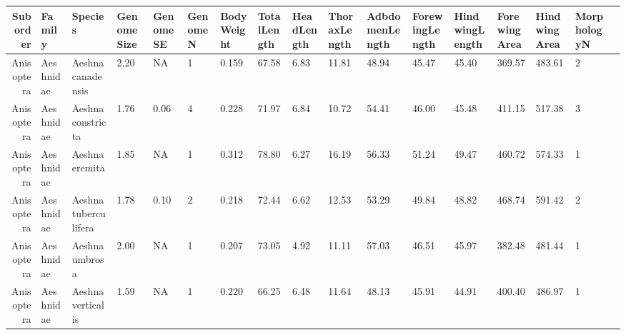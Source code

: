 \documentclass[11pt]{article}
\begin{document}
    \begin{tabular}{r|llllllllllllllll}
 Suborder & Family & Species & GenomeSize & GenomeSE & GenomeN & BodyWeight & TotalLength & HeadLength & ThoraxLength & AdbdomenLength & ForewingLength & HindwingLength & ForewingArea & HindwingArea & MorphologyN\\
\hline
	 Anisoptera           & Aeshnidae            & Aeshna canadensis    & 2.20                 &   NA                 & 1                    & 0.159                & 67.58                & 6.83                 & 11.81                & 48.94                & 45.47                & 45.40                & 369.57               & 483.61               & 2                   \\
	 Anisoptera           & Aeshnidae            & Aeshna constricta    & 1.76                 & 0.06                 & 4                    & 0.228                & 71.97                & 6.84                 & 10.72                & 54.41                & 46.00                & 45.48                & 411.15               & 517.38               & 3                   \\
	 Anisoptera           & Aeshnidae            & Aeshna eremita       & 1.85                 &   NA                 & 1                    & 0.312                & 78.80                & 6.27                 & 16.19                & 56.33                & 51.24                & 49.47                & 460.72               & 574.33               & 1                   \\
	 Anisoptera           & Aeshnidae            & Aeshna tuberculifera & 1.78                 & 0.10                 & 2                    & 0.218                & 72.44                & 6.62                 & 12.53                & 53.29                & 49.84                & 48.82                & 468.74               & 591.42               & 2                   \\
	 Anisoptera           & Aeshnidae            & Aeshna umbrosa       & 2.00                 &   NA                 & 1                    & 0.207                & 73.05                & 4.92                 & 11.11                & 57.03                & 46.51                & 45.97                & 382.48               & 481.44               & 1                   \\
	 Anisoptera           & Aeshnidae            & Aeshna verticalis    & 1.59                 &   NA                 & 1                    & 0.220                & 66.25                & 6.48                 & 11.64                & 48.13                & 45.91                & 44.91                & 400.40               & 486.97               & 1                   \\
\end{tabular}
\end{document}
